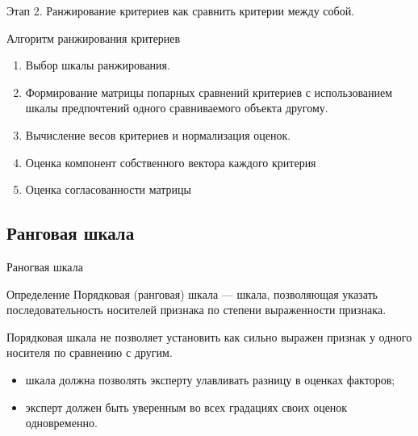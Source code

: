 \documentclass[unicode,11pt,notheorems,xcolor=table]{beamer}
\begin{document}



\begin{frame}{Этап 2. Ранжирование критериев}{}
     как сравнить критерии между собой.
    \begin{block}{Алгоритм ранжирования критериев}
    \begin{enumerate}
        \item Выбор шкалы ранжирования.
        \item Формирование матрицы попарных сравнений критериев с использованием шкалы предпочтений одного сравниваемого объекта другому.
        \item Вычисление весов критериев и нормализация оценок.
        \item Оценка компонент собственного вектора каждого критерия
        \item Оценка согласованности матрицы
    \end{enumerate}
\end{block}
\end{frame}

\subsection{Ранговая шкала}
\begin{frame}{Раногвая шкала}{}
\begin{block}{Определение}
    Порядковая (ранговая) шкала --- шкала, позволяющая указать последовательность носителей признака по степени выраженности признака. 
\end{block}

\medskip
\alert{Порядковая шкала не позволяет установить как сильно выражен признак у одного носителя по сравнению с другим.}

\begin{itemize}
    \item шкала должна позволять эксперту улавливать разницу в оценках факторов;
    \item эксперт должен быть уверенным во всех градациях своих оценок одновременно.
\end{itemize}
\end{frame}
\end{document}
